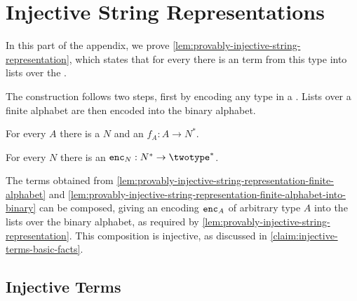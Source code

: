 \section{Injective String Representations}
\label{sec:provably-injective-string-representations}
In this part of the appendix, we prove \cref{lem:provably-injective-string-representation}, which states that for every  there is an  term from this type into lists over the . 

The construction follows two steps, first by encoding any type in a . Lists over a finite alphabet are then encoded into the binary alphabet.

\begin{claim}\label{lem:provably-injective-string-representation-finite-alphabet}
    For every  $A$ there is a  $N$ and an    $f_A : A \to N^*$.
\end{claim}

\begin{claim}\label{lem:provably-injective-string-representation-finite-alphabet-into-binary}
    For every  $N$ there is an    $\stringrep N : N^* \to {\twotype}^*$.
\end{claim}

The terms obtained from \cref{lem:provably-injective-string-representation-finite-alphabet} and \cref{lem:provably-injective-string-representation-finite-alphabet-into-binary} can be composed, giving an encoding $\mathtt{enc}_{A}$ of arbitrary type $A$ into the lists over the binary alphabet, as required by \cref{lem:provably-injective-string-representation}. This composition is injective, as discussed in \cref{claim:injective-terms-basic-facts}.

\subsection{Injective Terms}

